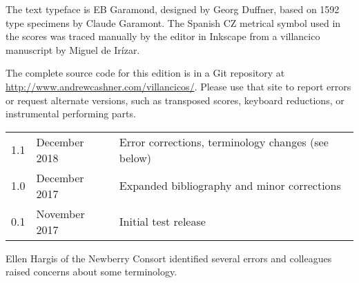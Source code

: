 The text typeface is EB Garamond, designed by Georg Duffner, based on 1592 type 
specimens by Claude Garamont.
The Spanish CZ metrical symbol used in the scores was traced manually by the
editor in Inkscape from a villancico manuscript by Miguel de Irízar.

The complete source code for this edition is in a Git repository at
\url{http://www.andrewcashner.com/villancicos/}.
Please use that site to report errors or request alternate versions, such as
transposed scores, keyboard reductions, or instrumental performing parts.


\begin{tabular}{rlp{}}
    1.1 & December 2018 & Error corrections, terminology changes (see below) \\
   1.0 & December 2017 & Expanded bibliography and minor corrections\\
    0.1 & November 2017 & Initial test release\\
\end{tabular}


Ellen Hargis of the Newberry Consort identified several errors and colleagues
raised concerns about some terminology.

